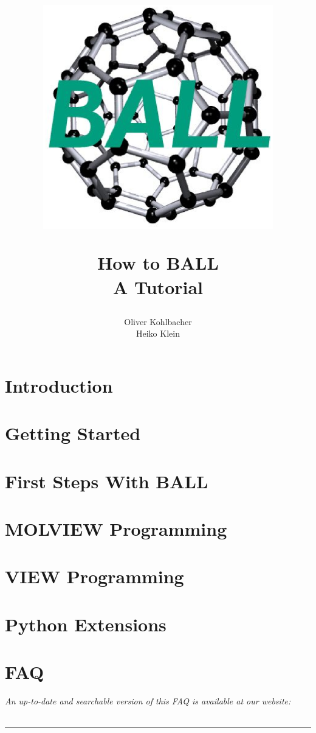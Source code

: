 \documentclass[12pt,twoside]{report}
\author{Oliver Kohlbacher\\ Heiko Klein}
\title{
	\begin{center}
		\includegraphics[width=10cm]{logo.eps}
	\end{center}
	\Huge How to BALL\\ 
	\Large A Tutorial
}
\begin{document}
\maketitle

\setcounter{page}{1}
\tableofcontents
{}
\setcounter{page}{1}


\chapter{Introduction}
\label{chapter:introduction}



\chapter{Getting Started}
\label{chapter:getting-started}




\chapter{First Steps With BALL}
\label{chapter:first-steps}




\chapter{MOLVIEW Programming}
\label{chapter:molview-programming}


\chapter{VIEW Programming}
\label{chapter:view-programming}


\chapter{Python Extensions}
\label{chapter:python}


\chapter{FAQ}
\label{chapter:faq}
\newpage
\noindent
{\it An up-to-date and searchable version of this FAQ is available at our website:\\
}\\
\hspace{1mm}
\rule{\textwidth}{0.1pt}
\hspace{3mm}



\newpage
{}
\printindex
\renewcommand{\bibname}{References}


\end{document}
